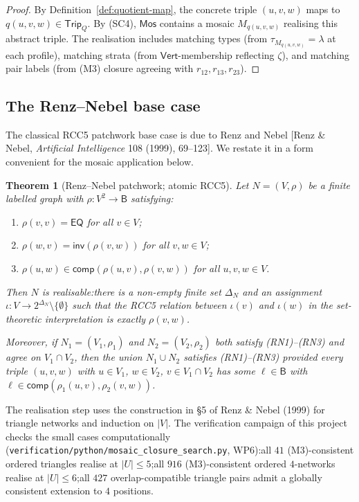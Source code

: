 \documentclass[11pt]{article}
\newtheorem{theorem}{Theorem}[section]
\newcommand{\Base}{\mathsf{B}}
\newcommand{\EQ}{\mathsf{EQ}}
\newcommand{\Inv}{\mathsf{inv}}
\newcommand{\comp}{\mathsf{comp}}
\newcommand{\Mos}{\mathsf{Mos}}
\newcommand{\Vrt}{\mathsf{Vert}}
\newcommand{\Trip}{\mathsf{Trip}}
\begin{document}
\begin{proof}
By Definition~\ref{def:quotient-map}, the concrete triple $(u,v,w)$
maps to $q(u,v,w)\in\Trip_Q$.  By (SC4), $\Mos$ contains a mosaic
$M_{q(u,v,w)}$ realising this abstract triple.  The realisation
includes matching types (from $\tau_{M_{q(u,v,w)}}=\lambda$ at each
profile), matching strata (from $\Vrt$-membership reflecting
$\zeta$), and matching pair labels (from (M3) closure agreeing with
$r_{12},r_{13},r_{23}$).
\end{proof}

\subsection{The Renz--Nebel base case}
\label{ssec:renz-nebel}

The classical RCC5 patchwork base case is due to Renz and Nebel [Renz
\& Nebel, \emph{Artificial Intelligence} 108 (1999), 69--123].  We
restate it in a form convenient for the mosaic application below.

\begin{theorem}[Renz--Nebel patchwork; atomic RCC5]\label{thm:RN}
Let $N=(V,\rho)$ be a finite labelled graph with
$\rho:V^2\to\Base$ satisfying:
\begin{enumerate}[label=\textnormal{(RN\arabic*)},leftmargin=3em]
  \item $\rho(v,v)=\EQ$ for all $v\in V$;
  \item $\rho(w,v)=\Inv(\rho(v,w))$ for all $v,w\in V$;
  \item $\rho(u,w)\in\comp(\rho(u,v),\rho(v,w))$ for all $u,v,w\in V$.
\end{enumerate}
Then $N$ is realisable:\@ there is a non-empty finite set $\Delta_N$
and an assignment $\iota:V\to 2^{\Delta_N}\setminus\{\emptyset\}$
such that the RCC5 relation between $\iota(v)$ and $\iota(w)$ in the
set-theoretic interpretation is exactly $\rho(v,w)$.

Moreover, if $N_1=(V_1,\rho_1)$ and $N_2=(V_2,\rho_2)$ both satisfy
\textnormal{(RN1)--(RN3)} and agree on $V_1\cap V_2$, then the union
$N_1\cup N_2$ satisfies \textnormal{(RN1)--(RN3)} provided every
triple $(u,v,w)$ with $u\in V_1$, $w\in V_2$, $v\in V_1\cap V_2$ has
some $\ell\in\Base$ with $\ell\in\comp(\rho_1(u,v),\rho_2(v,w))$.
\end{theorem}

The realisation step uses the construction in \S 5 of Renz \& Nebel
(1999) for triangle networks and induction on $|V|$.  The
verification campaign of this project checks the small cases
computationally (\texttt{verification/python/mosaic\_closure\_search.py},
WP6):\@ all $41$ (M3)-consistent ordered triangles realise at
$|U|\le 5$;\@ all $916$ (M3)-consistent ordered $4$-networks realise
at $|U|\le 6$;\@ all $427$ overlap-compatible triangle pairs admit a
globally consistent extension to $4$ positions.
\end{document}
